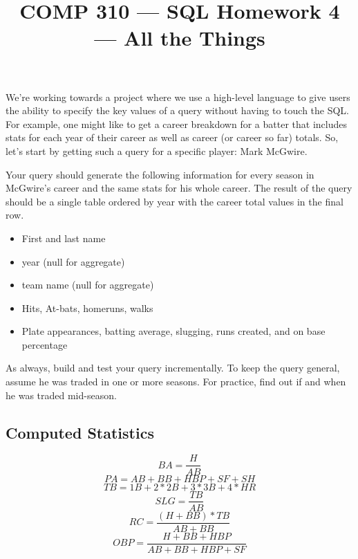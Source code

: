 \documentclass[nobib]{tufte-handout}
\title{COMP 310 --- SQL Homework 4 --- All the Things }
\author{  }
\date{ }
\begin{document}
\maketitle

We're working towards a project where we use a high-level language to give users the ability to specify the key values of a query without having to touch the SQL.  For example, one might like to get a career breakdown for a batter that includes stats for each year of their career as well as career (or career so far) totals.  So, let's start by getting such a query for a specific player: Mark McGwire. 

Your query should generate the following information for every season in McGwire's career and the same stats for his whole career. The result of the query should be a single table ordered by year with the career total values in the final row. 

\begin{itemize}
    \item First and last name
    \item year (null for aggregate)
    \item team name (null for aggregate)
    \item Hits, At-bats, homeruns, walks 
    \item Plate appearances, batting average, slugging, runs created, and on base percentage 
\end{itemize}

As always, build and test your query incrementally. To keep the query general, assume he was traded in one or more seasons. For practice, find out if and when he was traded mid-season. 

\subsection*{Computed Statistics}

\[BA = \dfrac{H}{AB} \] 
\[PA = AB + BB + HBP + SF + SH \] 
\[TB = 1B + 2*2B + 3*3B + 4*HR \] 
\[SLG = \dfrac{TB}{AB} \] 
\[RC = \dfrac{(H+BB)*TB}{AB+BB} \]
\[OBP = \dfrac{H+BB+HBP}{AB+BB+HBP+SF} \]
\end{document}
